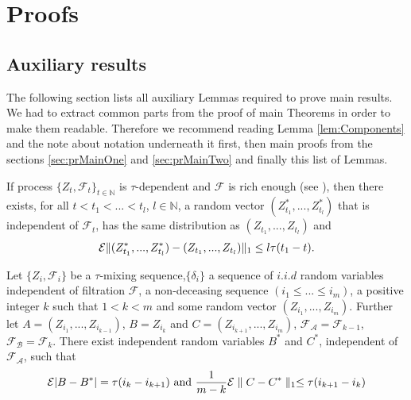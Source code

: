 \section{Proofs}

\subsection{Auxiliary results }
\label{label:aux}
The following section lists all auxiliary Lemmas required to prove main results. We had to extract common parts from the proof of main Theorems in order to make them readable. Therefore we recommend reading Lemma \ref{lem:Components} and the note about notation underneath it first, then main proofs from the sections \ref{sec:prMainOne} and \ref{sec:prMainTwo} and finally this list of Lemmas. 

\begin{proposition}{\cite[p.259, Equation 2.1]{leucht_dependent_2013}}
\label{prop:Coupling}
If process  $\{Z_t,\mathcal{F}_t\}_{t \in \mathbb{N}}$  is $\tau$-dependent and $\mathcal{F}$ is rich enough (see \cite[Lemma 5.3]{dedecker2007weak}), then there exists, for all $t<t_1<...<t_l$, $l \in \mathbb N$, a random vector $(Z_{t_1}^*,...,Z_{t_l}^*)$ that is independent of $\mathcal F_t$, has the same distribution  as $(Z_{t_1},...,Z_{t_l})$ and 
\begin{align*}
\mathcal{E} \lVert(Z_{t_1}^*,...,Z_{t_l}^*) - (Z_{t_1},...,Z_{t_l})\rVert_1 \leq l \tau(t_1-t).
\end{align*}
\end{proposition}

\begin{lemma}
\label{lem:complicated}
Let $\{Z_i,\mathcal{F}_i\}$ be a $\tau$-mixing sequence,$\{ \delta_i \}$ a sequence of $i.i.d$ random variables independent of filtration $\mathcal{F}$, a non-deceasing sequence $(i_1\leq ... \leq i_m)$, a positive integer $k$ such that $1 < k<m$ and some random vector $(Z_{i_1},...,Z_{i_m})$. Further let $A = (Z_{i_1},...,Z_{i_{k-1}})$, $B= Z_{i_k}$ and $C=(Z_{i_{k+1}},...,Z_{i_{m}})$,  $\mathcal{F_A} =\mathcal{F}_{k-1}$, $\mathcal{F_B}  =\mathcal{F}_{k}$. There exist independent random variables $B^*$ and $C^*$, independent of $\mathcal{F_A}$, such that  
\begin{align}
\mathcal{E} |B-B^*| = \tau(i_{k} -i_{k+1}) \text{ and } \frac{1} {m-k} \mathcal{E} \parallel C-C^* \parallel_1 \leq \tau(i_{k+1}-i_k) 
\end{align}    
\end{lemma}


